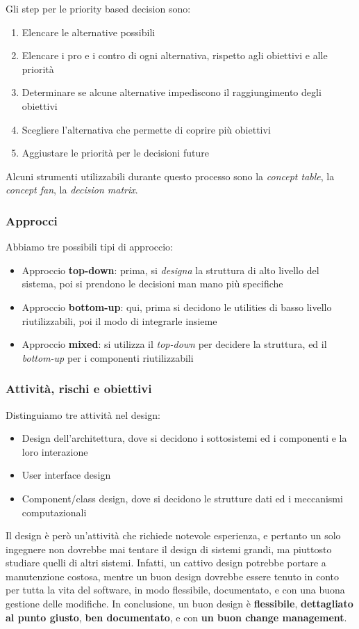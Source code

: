 \documentclass[11pt]{article}
\begin{document}
Gli step per le priority based decision sono:
\begin{enumerate}
    \item Elencare le alternative possibili
    \item Elencare i pro e i contro di ogni alternativa, rispetto agli obiettivi e alle priorità 
    \item Determinare se alcune alternative impediscono il raggiungimento degli obiettivi 
    \item Scegliere l'alternativa che permette di coprire più obiettivi 
    \item Aggiustare le priorità per le decisioni future
\end{enumerate}
Alcuni strumenti utilizzabili durante questo processo sono la \textit{concept table}, la \textit{concept fan}, la \textit{decision matrix}.
\subsubsection{Approcci}
Abbiamo tre possibili tipi di approccio:
\begin{itemize}
    \item Approccio \textbf{top-down}: prima, si \textit{designa} la struttura di alto livello del sistema, poi si prendono le decisioni man mano più specifiche 
    \item Approccio \textbf{bottom-up}: qui, prima si decidono le utilities di basso livello riutilizzabili, poi il modo di integrarle insieme 
    \item Approccio \textbf{mixed}: si utilizza il \textit{top-down} per decidere la struttura, ed il \textit{bottom-up} per i componenti riutilizzabili 
\end{itemize}
\subsubsection{Attività, rischi e obiettivi}
Distinguiamo tre attività nel design:
\begin{itemize}
    \item Design dell'architettura, dove si decidono i sottosistemi ed i componenti e la loro interazione 
    \item User interface design 
    \item Component/class design, dove si decidono le strutture dati ed i meccanismi computazionali
\end{itemize}
Il design è però un'attività che richiede notevole esperienza, e pertanto un solo ingegnere non dovrebbe mai tentare il design di sistemi grandi, ma piuttosto studiare quelli di altri sistemi. Infatti, un cattivo design potrebbe portare a manutenzione costosa, mentre un buon design dovrebbe essere tenuto in conto per tutta la vita del software, in modo flessibile, documentato, e con una buona gestione delle modifiche. 
In conclusione, un buon design è \textbf{flessibile}, \textbf{dettagliato al punto giusto}, \textbf{ben documentato}, e con \textbf{un buon change management}.
\end{document}
